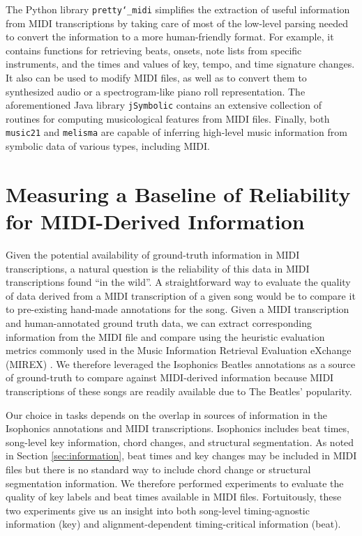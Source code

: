 \documentclass{article}
\begin{document}
The Python library \texttt{pretty\char`_midi} \cite{raffel2014pretty_midi} simplifies the extraction of useful information from MIDI transcriptions by taking care of most of the low-level parsing needed to convert the information to a more human-friendly format.
For example, it contains functions for retrieving beats, onsets, note lists from specific instruments, and the times and values of key, tempo, and time signature changes.
It also can be used to modify MIDI files, as well as to convert them to synthesized audio or a spectrogram-like piano roll representation.
The aforementioned Java library \texttt{jSymbolic} contains an extensive collection of routines for computing musicological features from MIDI files.
Finally, both \texttt{music21} and \texttt{melisma} are capable of inferring high-level music information from symbolic data of various types, including MIDI.

\section{Measuring a Baseline of Reliability for MIDI-Derived Information}
\label{sec:measuring}

Given the potential availability of ground-truth information in MIDI transcriptions, a natural question is the reliability of this data in MIDI transcriptions found ``in the wild''.
A straightforward way to evaluate the quality of data derived from a MIDI transcription of a given song would be to compare it to pre-existing hand-made annotations for the song.
Given a MIDI transcription and human-annotated ground truth data, we can extract corresponding information from the MIDI file and compare using the heuristic evaluation metrics commonly used in the Music Information Retrieval Evaluation eXchange (MIREX) \cite{downie2008music}.
We therefore leveraged the Isophonics Beatles annotations \cite{mauch2009omras2} as a source of ground-truth to compare against MIDI-derived information because MIDI transcriptions of these songs are readily available due to The Beatles' popularity.

Our choice in tasks depends on the overlap in sources of information in the Isophonics annotations and MIDI transcriptions.
Isophonics includes beat times, song-level key information, chord changes, and structural segmentation.
As noted in Section \ref{sec:information}, beat times and key changes may be included in MIDI files but there is no standard way to include chord change or structural segmentation information.
We therefore performed experiments to evaluate the quality of key labels and beat times available in MIDI files.
Fortuitously, these two experiments give us an insight into both song-level timing-agnostic information (key) and alignment-dependent timing-critical information (beat).
\end{document}
